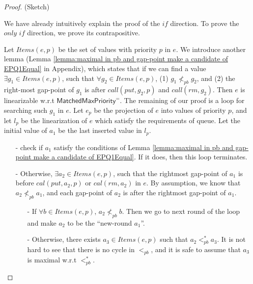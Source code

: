 \begin {proof} (Sketch)

We have already intuitively explain the proof of the $\textit{if}$ direction. To prove the $\textit{only if}$ direction, we prove its contrapositive. %

Let $\textit{Items}(e,p)$ be the set of values with priority $p$ in $e$. We introduce another lemma (Lemma \ref{lemma:maximal in pb and gap-point make a candidate of EPQ1Equal} in Appendix), which states that if we can find a value $\exists g_1 \in \textit{Items}(e,p)$, such that $\forall g_2 \in \textit{Items}(e,p)$, (1) $g_1 \nless_{\textit{pb}} g_2$, and (2) the right-most gap-point of $g_1$ is after $\textit{call}(\textit{put},g_2,p)$ and $\textit{call}(\textit{rm},g_2)$. Then $e$ is linearizable w.r.t $\mathsf{MatchedMaxPriority}^{=}$.
The remaining of our proof is a loop for searching such $g_1$ in $e$. Let $e_p$ be the projection of $e$ into values of priority $p$, and let $l_p$ be the linearization of $e$ which satisfy the requirements of queue. Let the initial value of $a_1$ be the last inserted value in $l_p$.

\begin{itemize}
\setlength{\itemsep}{0.5pt}
\item[-] check if $a_1$ satisfy the conditions of Lemma \ref{lemma:maximal in pb and gap-point make a candidate of EPQ1Equal}. If it does, then this loop terminates.

\item[-] Otherwise, $\exists a_2 \in \textit{Items}(e,p)$, such that the rightmost gap-point of $a_1$ is before $\textit{cal}(\textit{put},a_2,p)$ or $\textit{cal}(\textit{rm},a_2)$ in $e$. By assumption, we know that $a_2 \nless_{\textit{pb}} a_1$, and each gap-point of $a_2$ is after the rightmost gap-point of $a_1$.

    \begin{itemize}
    \setlength{\itemsep}{0.5pt}
    \item[-] If $\forall b \in \textit{Items}(e,p)$, $a_2\not<_{\textit{pb}}b$. Then we go to next round of the loop and make $a_2$ to be the ``new-round $a_1$''.
    \item[-] Otherwise, there exists $a_3 \in \textit{Items}(e,p)$ such that $a_2 <_{\textit{pb}}^* a_3$. It is not hard to see that there is no cycle in $<_{\textit{pb}}$, and it is safe to assume that $a_3$ is maximal w.r.t $<_{\textit{pb}}^*$.


\end{itemize}
\end{itemize}
\end{proof}
